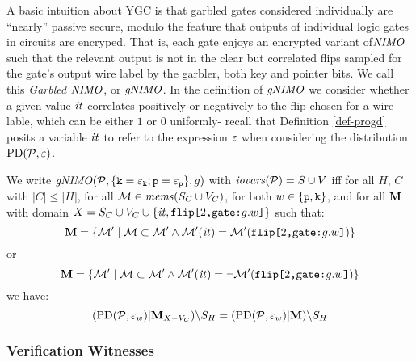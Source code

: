 A basic intuition about YGC is that garbled gates considered
individually are ``nearly'' passive secure, modulo the feature that
outputs of individual logic gates in circuits are encryped. That is,
each gate enjoys an encrypted variant of$\mathit{NIMO}$ such that the relevant
output is not in the clear but correlated flips sampled for the gate's
output wire label by the garbler, both key and pointer bits. We call
this \emph{Garbled $\mathit{NIMO}$}, or $\mathit{gNIMO}$. In the definition of
$\mathit{gNIMO}$ we consider whether a given value $\mathit{it}$ correlates
positively or negatively to the flip chosen for a wire lable, which
can be either $1$ or $0$ uniformly- recall that
Definition \ref{def-progd} posits a variable $\mathit{it}$ to refer to the
expression $\varepsilon$ when considering the distribution
$\mathrm{PD}(\mathcal{P},\varepsilon)$.
\begin{definition}
  We write $\mathit{gNIMO}(\mathcal{P},\{ \texttt{k} = \varepsilon_{\texttt{k}}; \texttt{p} =
  \varepsilon_{\texttt{p}}\}, g)$ with $\mathit{iovars}(\mathcal{P}) = S \cup V$ iff for all $H$,
  $C$ with $|C| \le |H|$, for all $\mathcal{M} \in \mathit{mems}(S_C \cup V_C)$,
  for both $w \in \{\texttt{p},\texttt{k}\}$, and for all $\mathbf{M}$ with
  domain $X = S_C \cup V_C \cup \{ \mathit{it}, \texttt{flip[}2\texttt{,}\texttt{gate:}g.w\texttt{]} \}$
  such that:
  $$
  \mathbf{M} = \{ \mathcal{M}' \mid \mathcal{M} \subset \mathcal{M}' \wedge 
  \mathcal{M}'(\mathit{it}) = \mathcal{M}'(\texttt{flip[}2\texttt{,}\texttt{gate:}g.w\texttt{]}) \} 
  $$
  or
  $$
  \mathbf{M} = \{ \mathcal{M}' \mid \mathcal{M} \subset \mathcal{M}' \wedge 
  \mathcal{M}'(\mathit{it}) = \neg\mathcal{M}'(\texttt{flip[}2\texttt{,}\texttt{gate:}g.w\texttt{]}) \} 
  $$
  we have:
  $$
  (\mathrm{PD}(\mathcal{P},\varepsilon_w)|\mathbf{M}_{X-{V_C}})\backslash S_H =
  (\mathrm{PD}(\mathcal{P},\varepsilon_w)|\mathbf{M})\backslash S_H
  $$
\end{definition}

\subsubsection{Verification Witnesses}


